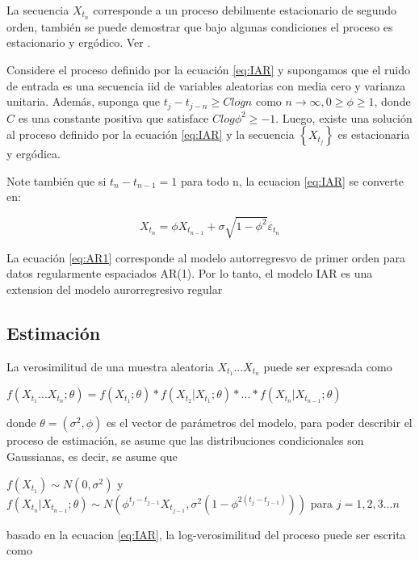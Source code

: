 La secuencia $X_{t_n}$ corresponde a un proceso debilmente estacionario de segundo orden,
también se puede demostrar que bajo algunas condiciones el proceso es estacionario
y ergódico. Ver \cite[]{eyheramendy2018irregular}.\\

\begin{theorem}
Considere el proceso definido por la ecuación \ref{eq:IAR} y supongamos que el ruido de entrada es una secuencia
iid de variables aleatorias con media cero y varianza unitaria. Además, suponga que $t_j - t_{j-n} \geq C log n$
como $n \to \infty, 0 \ge \phi \ge 1$, donde $C$ es una constante positiva que satisface $Clog \phi^2 \ge -1$. Luego,
existe una solución al proceso definido por la ecuación \ref{eq:IAR} y la secuencia $\left\lbrace X_{t_j} \right\rbrace$
es estacionaria y ergódica.
\end{theorem}


Note también que si $t_n - t_{n-1} = 1$ para todo n, la ecuacion \ref{eq:IAR} se converte en:

\begin{equation}
	X_{t_n} = \phi X_{t_{n-1}} + \sigma \sqrt{1- \phi^2 }\varepsilon_{t_n}
\label{eq:AR1}
\end{equation}

La ecuación \ref{eq:AR1} corresponde al modelo autorregresvo de primer orden para datos regularmente espaciados AR(1). Por lo tanto, el modelo IAR
es una extension del modelo aurorregresivo regular

\subsection{Estimación}
La verosimilitud de una muestra aleatoria ${X_{t_1} ... X_{t_n}}$ puede ser expresada como

$f(X_{t_1} ... X_{t_n}; \theta) = f(X_{t_1};\theta)*f(X_{t_2}|X_{t_1};\theta) * ... * f(X_{t_n}|X_{t_{n-1}};\theta)$ 

donde $\theta = (\sigma^2,\phi)$ es el vector de parámetros del modelo, para poder describir el proceso de estimación, se asume que 
las distribuciones condicionales son Gaussianas, es decir, se asume que 

$f(X_{t_1}) \sim N(0, \sigma^2)$ y $f(X_{t_n}|X_{t_{n-1}};\theta) \sim N(\phi^{t_j-t_{j-1}}X_{t_{j-1}}, \sigma^2(1-\phi^{2(t_j-t_{j-1})}))$ 
para $j = 1,2,3 ... n$

basado en la ecuacion \ref{eq:IAR}, la log-verosimilitud del proceso puede ser escrita como

